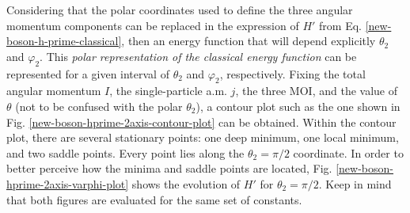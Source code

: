 Considering that the polar coordinates used to define the three angular momentum components can be replaced in the expression of $H'$ from Eq. \ref{new-boson-h-prime-classical}, then an energy function that will depend explicitly $\theta_2$ and $\varphi_2$. This \emph{polar representation of the classical energy function} can be represented for a given interval of $\theta_2$ and $\varphi_2$, respectively. Fixing the total angular momentum $I$, the single-particle a.m. $j$, the three MOI, and the value of $\theta$ (not to be confused with the polar $\theta_2$), a contour plot such as the one shown in Fig. \ref{new-boson-hprime-2axis-contour-plot} can be obtained. Within the contour plot, there are several stationary points: one deep minimum, one local minimum, and two saddle points. Every point lies along the $\theta_2=\pi/2$ coordinate. In order to better perceive how the minima and saddle points are located, Fig. \ref{new-boson-hprime-2axis-varphi-plot} shows the evolution of $H'$ for $\theta_2=\pi/2$. Keep in mind that both figures are evaluated for the same set of constants.
